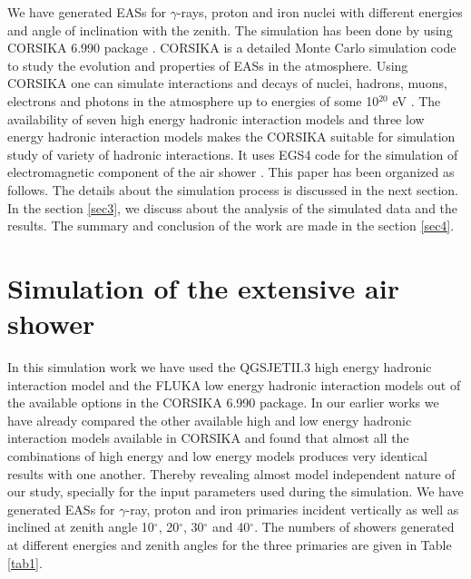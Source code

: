 \documentclass[amsmath,amssymb,showpacs,showkeywords]{revtex4}
\begin{document}
We have generated EASs for $\gamma$-rays, proton and iron nuclei with 
different energies and angle of inclination with the zenith. The simulation 
has been done by using CORSIKA 6.990 package \cite{Heck}. CORSIKA is a detailed
Monte Carlo simulation code to study the evolution and properties of EASs in 
the atmosphere. Using CORSIKA one can simulate interactions and decays of 
nuclei, hadrons, muons, electrons and photons in the atmosphere up to energies 
of some 10$^{20}$ eV \cite{Knapp}. The availability of seven  high energy 
hadronic interaction models and three low energy hadronic interaction models 
makes the CORSIKA suitable for simulation study of variety of hadronic 
interactions. It uses EGS4 code \cite{Nelson} for the simulation of 
electromagnetic component of the air shower \cite{Knapp}. This paper has been 
organized as follows. The details about the simulation 
process is discussed in the next section. In the section \ref{sec3}, we 
discuss about the analysis of the simulated data and the results. The summary 
and conclusion of the work are made in the section \ref{sec4}.    

\section{Simulation of the extensive air shower}
\label{sec2}
In this simulation work we have used the QGSJETII.3 high energy hadronic 
interaction model and the FLUKA low energy hadronic interaction models out of 
the available options in the CORSIKA 6.990 package. In our earlier works 
\cite{Hazarika, Das} we have already compared the other available high and low 
energy hadronic interaction models available in CORSIKA and found that almost 
all the combinations of high energy and low energy models produces very 
identical results with one another. Thereby revealing almost model independent 
nature of our study, specially for the input parameters used during the 
simulation. We have generated EASs for $\gamma$-ray, proton and iron primaries 
incident vertically as well as inclined at zenith angle 10$^{\circ}$, 
20$^{\circ}$, 30$^{\circ}$ and 40$^{\circ}$. The numbers of showers generated 
at different energies and zenith angles for the three primaries are given in 
Table \ref{tab1}.
\end{document}
